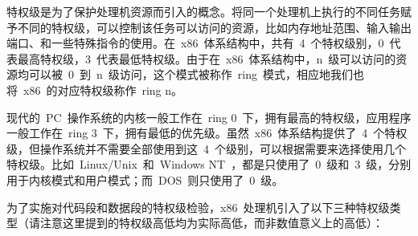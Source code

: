 特权级是为了保护处理机资源而引入的概念。将同一个处理机上执行的不同任务赋予不同的特权级，可以控制该任务可以访问的资源，比如内存地址范围、输入输出端口、和一些特殊指令的使用。在~x86~体系结构中，共有~4~个特权级别，0~代表最高特权级，3~代表最低特权级。由于在~x86~体系结构中，n~级可以访问的资源均可以被~0~到~n~级访问，这个模式被称作~ring~模式，相应地我们也将~x86~的对应特权级称作~ring n。

现代的~PC~操作系统的内核一般工作在~ring 0~下，拥有最高的特权级，应用程序一般工作在~ring 3~下，拥有最低的优先级。虽然~x86~体系结构提供了~4~个特权级，但操作系统并不需要全部使用到这~4~个级别，可以根据需要来选择使用几个特权级。比如~Linux/Unix~和~Windows NT~，都是只使用了~0~级和~3~级，分别用于内核模式和用户模式；而~DOS~则只使用了~0~级。

为了实施对代码段和数据段的特权级检验，x86~处理机引入了以下三种特权级类型（请注意这里提到的特权级高低均为实际高低，而非数值意义上的高低）：

